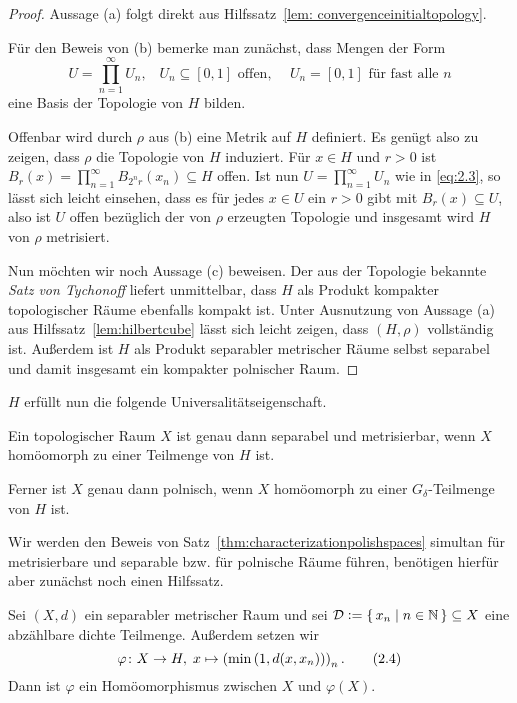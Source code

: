 \documentclass[../main/main.tex]{subfiles}
\begin{document}
	\begin{proof}
		Aussage (a) folgt direkt aus Hilfssatz~\ref{lem: convergenceinitialtopology}.
		
		Für den Beweis von (b) bemerke man zunächst, dass Mengen der Form 
		\[U = \prod_{n=1}^{\infty} U_n\text{,} \quad U_n \subseteq [0, 1] \text{ offen, }
		\quad U_n = [0, 1] \text{ für fast alle } n \label{eq:2.3} \tag{2.3}\]
		eine Basis der Topologie von $H$ bilden.
		
		Offenbar wird durch $\rho$ aus (b) eine Metrik auf $H$ definiert. 
		Es genügt also zu zeigen, dass $\rho$ die Topologie von $H$ induziert. 
		Für $x \in H$ und $r > 0$ ist 
		$B_r(x) = \prod_{n=1}^{\infty} B_{2^n r}(x_n) \subseteq H$ 
		offen. Ist nun $U = \prod_{n=1}^{\infty} U_n$ wie in \eqref{eq:2.3}, 
		so lässt sich leicht einsehen, dass es für jedes $x \in U$ ein $r > 0$ 
		gibt mit $B_r(x) \subseteq U$, also ist $U$ offen bezüglich der von $\rho$ 
		erzeugten Topologie und insgesamt wird $H$ von $\rho$ metrisiert.
		
		Nun möchten wir noch Aussage (c) beweisen. Der aus der Topologie bekannte \emph{Satz von Tychonoff} liefert 
		unmittelbar, dass $H$ als Produkt kompakter topologischer Räume 
		ebenfalls kompakt ist.
		Unter Ausnutzung von Aussage (a) aus 
		Hilfssatz~\ref{lem:hilbertcube} lässt sich leicht zeigen, dass $(H, \rho)$ 
		vollständig ist. Außerdem ist $H$ als Produkt separabler metrischer Räume selbst separabel und 
		damit insgesamt ein kompakter polnischer Raum.
	\end{proof}
	
	$H$ erfüllt nun die folgende Universalitätseigenschaft.
	
	\begin{Satz}
		\label{thm:characterizationpolishspaces}
		Ein topologischer Raum $X$ ist genau dann separabel und metrisierbar, wenn $X$ homöomorph zu einer Teilmenge von $H$ ist.
		
		Ferner ist $X$ genau dann polnisch, wenn $X$ homöomorph zu einer $G_\delta$-Teilmenge von $H$ ist.
	\end{Satz}
	
	Wir werden den Beweis von Satz~\ref{thm:characterizationpolishspaces} simultan für metrisierbare und 
	separable bzw. für polnische Räume führen, benötigen hierfür aber zunächst noch einen Hilfssatz.
	
	\begin{Hilfssatz}
		\label{lem:characterizationpolishspaces}
		Sei $(X, d)$ ein separabler metrischer Raum und sei 
		$\mathcal{D} \vcentcolon = \left\{\, x_n \; \middle| \; n \in \mathbb{N} \,\right\} \subseteq X$ eine abzählbare 
		dichte Teilmenge. Außerdem setzen wir
		\[\varphi \colon X \to H, \; x \mapsto \left(\min \left(1, d(x, x_n) \right) \right)_n  \text{.} \label{eq:2.4} \tag{2.4}\]
		Dann ist $\varphi$ ein Homöomorphismus zwischen $X$ und $\varphi(X)$.
	\end{Hilfssatz}
	
\end{document}
